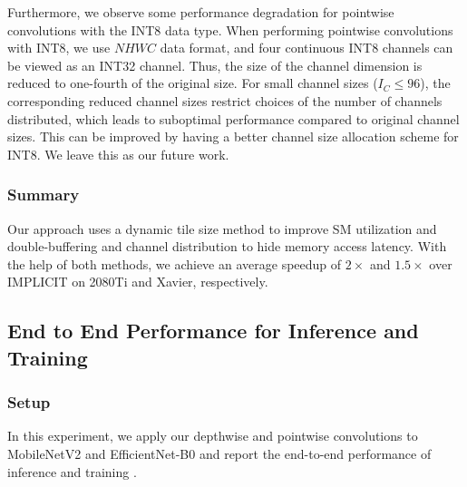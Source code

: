 Furthermore, we observe some performance degradation for pointwise convolutions with the INT8 data type. When performing pointwise
convolutions with INT8, we use $NHWC$ data format, and four continuous INT8 channels can be viewed as an INT32 channel. Thus, the size of
the channel dimension is reduced to one-fourth of the original size. For small channel sizes ($I_C \leq 96$), the corresponding reduced channel
sizes restrict choices of the number of channels distributed, which leads to suboptimal performance compared to original channel sizes.
This can be improved by having a better channel size allocation scheme for INT8. We leave this as our future work.


\subsubsection{Summary} Our approach uses a dynamic tile size method to improve SM utilization and double-buffering and channel distribution to hide
memory access latency. With the help of both methods, we achieve an average speedup of $2\times$ and $1.5\times$ over IMPLICIT on
2080Ti and Xavier, respectively.





\subsection{End to End Performance for Inference and Training}
\label{sec:inferexp}
\subsubsection{Setup}
In this experiment, we apply our depthwise and pointwise convolutions to MobileNetV2 and EfficientNet-B0 and report the end-to-end performance of inference and training .

